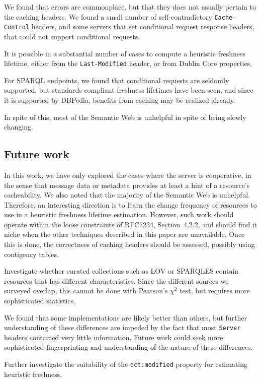 \documentclass{llncs}
\newcommand{\rdfterm}[1]{\texttt{#1}}
\newcommand{\httph}[1]{\texttt{#1}}
\begin{document}
We found that errors are commonplace, but that they does not usually
pertain to the caching headers. We found a small number of
self-contradictory \httph{Cache-Control} headers, and some servers
that set conditional request response headers, that could not support
conditional requests.

It is possible in a substantial number of cases to compute a heuristic
freshness lifetime, either from the \httph{Last-Modified} header, or
from Dublin Core properties. 

For SPARQL endpoints, we found that conditional requests are 
seldomly supported, but standards-compliant freshness lifetimes have
been seen, and since it is supported by DBPedia, benefits from caching
may be realized already.

In spite of this, most of the Semantic Web is unhelpful in spite of
being slowly changing.

\subsection{Future work}

In this work, we have only explored the cases where the server is
cooperative, in the sense that message data or metadata provides at
least a hint of a resource's cacheability. We also noted that the
majority of the Semantic Web is unhelpful. Therefore, an interesting
direction is to learn the change frequency of resources to use in a
heuristic freshness lifetime estimation. However, such work should
operate within the loose constraints of RFC7234, Section~4.2.2, and
should find it niche when the other techniques described in this paper
are unavailable. Once this is done, the correctness of caching headers
should be assessed, possibly using contigency tables.

Investigate whether curated collections such as LOV or SPARQLES
contain resources that has different characteristics. Since the
different sources we surveyed overlap, this cannot be done with
Pearson's $\chi^2$ test, but requires more sophisticated statistics.

We found that some implementations are likely better than others, but
further understanding of these differences are impeded by the fact
that most \httph{Server} headers contained very little
information. Future work could seek more sophisticated fingerprinting
and understanding of the nature of these differences.

Further investigate the suitability of the \rdfterm{dct:modified}
property for estimating heuristic freshness.
\end{document}
